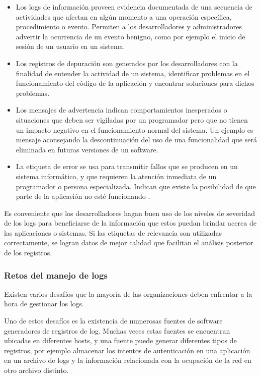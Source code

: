 \begin{itemize}
  \item Los logs de información proveen evidencia documentada de una secuencia de actividades que afectan en algún momento a una operación específica, procedimiento o evento. Permiten a los desarrolladores y administradores advertir la ocurrencia de un evento benigno, como por ejemplo el inicio de sesión de un usuario en un sistema.
  \item Los registros de depuración son generados por los desarrolladores con la finalidad de entender la actividad de un sistema, identificar problemas en el funcionamiento del código de la aplicación y encontrar soluciones para dichos problemas.

  \item Los mensajes de advertencia indican comportamientos inesperados o situaciones que deben ser vigiladas por un programador pero que no tienen un impacto negativo en el funcionamiento normal del sistema. Un ejemplo es mensaje aconsejando la descontinuación del uso de una funcionalidad que será eliminada en futuras versiones de un software.

  \item La etiqueta de error se usa para transmitir fallos que se producen en un sistema informático, y que requieren la atención inmediata de un programador o persona especializada. Indican que existe la posibilidad de que parte de la aplicación no esté funcionando \cite[p.~3]{monitoreo:logging_and_log_management}.
\end{itemize}

Es conveniente que los desarrolladores hagan buen uso de los niveles de severidad de los logs para beneficiarse de la información que estos puedan brindar acerca de las aplicaciones o sistemas. Si las etiquetas de relevancia son utilizadas correctamente, se logran datos de mejor calidad que facilitan el análisis posterior de los registros.

\subsubsection*{Retos del manejo de logs}
\label{retos_del_manejo_de_logs}

Existen varios desafíos que la mayoría de las organizaciones deben enfrentar a la hora de gestionar los logs.

Uno de estos desafíos es la existencia de numerosas fuentes de software generadores de registros de log. Muchas veces estas fuentes se encuentran ubicadas en diferentes hosts, y una fuente puede generar diferentes tipos de registros, por ejemplo almacenar los intentos de autenticación en una aplicación en un archivo de logs y la información relacionada con la ocupación de la red en otro archivo distinto.

